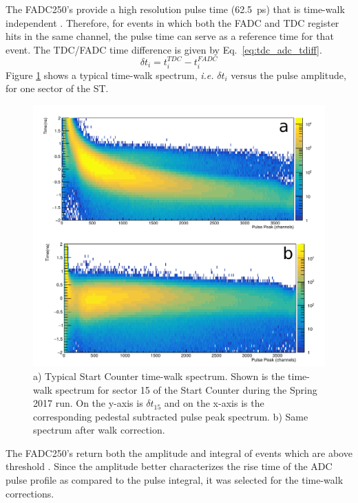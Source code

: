 The FADC250's provide a high resolution pulse time (62.5~ps) that is time-walk independent \cite{pooser16} \cite{dong_fadc}.  
Therefore, for events in which both the FADC and TDC register hits in the same channel, the pulse time can serve as a reference time for that event.  The TDC/FADC time difference is given by Eq.~\ref{eq:tdc_adc_tdiff}.
	\begin{equation} \label{eq:tdc_adc_tdiff}
		\delta t_{i} = t^{TDC}_{i} - t^{FADC}_{i}
	\end{equation}
Figure \ref{fig:twdistuncorrch15} shows a typical time-walk spectrum, \textit{i.e.} $\delta t_{i}$ versus the pulse amplitude, for one sector of the ST.
	\begin{figure}[!htb]
		\centering
		\includegraphics[width=1.0\columnwidth]{calibration/figs/ST_TW.pdf}
		\caption{a) Typical Start Counter time-walk spectrum.  Shown is the time-walk spectrum for sector 15 of the Start Counter during the Spring 2017 run. On the y-axis is $\delta t_{15}$ and on the x-axis is the corresponding pedestal subtracted pulse peak spectrum. b) Same spectrum after walk correction.}
		\label{fig:twdistuncorrch15}
	\end{figure}
The FADC250's return both the amplitude and integral of events which are above threshold \cite{dong_fadc}.  Since the amplitude better characterizes the rise time of the ADC pulse profile as compared to the pulse integral, it was selected for the time-walk corrections.

